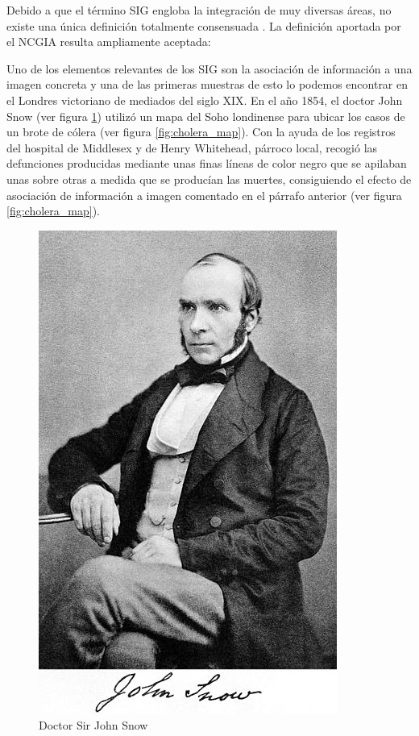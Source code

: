 Debido a que el término \ac{SIG} engloba la integración de muy diversas áreas, no existe una única definición totalmente consensuada \cite{Chr97}. La definición aportada por el \ac{NCGIA} resulta ampliamente aceptada:

\vspace{5mm}
\vspace{5mm}

Uno de los elementos relevantes de los \ac{SIG} son la asociación de información a una imagen concreta y una de las primeras muestras de esto lo podemos encontrar en el Londres victoriano de mediados del siglo XIX. En el año 1854, el doctor John Snow (ver figura \ref{fig:john_snow}) utilizó un mapa del Soho londinense para ubicar los casos de un brote de cólera (ver figura \ref{fig:cholera_map}). Con la ayuda de los registros del hospital de Middlesex y de Henry Whitehead, párroco local, recogió las defunciones producidas mediante unas finas líneas de color negro que se apilaban unas sobre otras a medida que se producían las muertes, consiguiendo el efecto de asociación de información a imagen comentado en el párrafo anterior \cite{Cai11} (ver figura \ref{fig:cholera_map}).

\begin{figure}[h!btp]
\centering
\includegraphics[scale=1, fbox={\fboxrule} 0mm]{images/03-antecedentes/02-john_snow.jpg}
\caption{Doctor Sir John Snow}
\label{fig:john_snow}
\end{figure}

